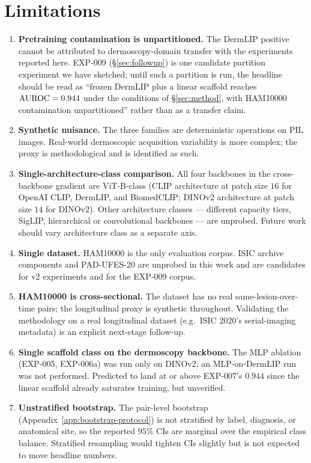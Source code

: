 \section{Limitations}
\label{sec:limitations}

\begin{enumerate}[leftmargin=2em]
\item \textbf{Pretraining contamination is unpartitioned.} The DermLIP
      positive cannot be attributed to dermoscopy-domain transfer with
      the experiments reported here. EXP-009 (\S\ref{sec:followup}) is
      one candidate partition experiment we have sketched; until such
      a partition is run, the headline should be read as ``frozen
      DermLIP plus a linear scaffold reaches $\mathrm{AUROC} = 0.944$ under
      the conditions of \S\ref{sec:method}, with HAM10000 contamination
      unpartitioned'' rather than as a transfer claim.
\item \textbf{Synthetic nuisance.} The three families are deterministic
      operations on PIL images. Real-world dermoscopic acquisition
      variability is more complex; the proxy is methodological and is
      identified as such.
\item \textbf{Single-architecture-class comparison.} All four backbones
      in the cross-backbone gradient are ViT-B-class (CLIP architecture
      at patch size $16$ for OpenAI CLIP, DermLIP, and BiomedCLIP;
      DINOv2 architecture at patch size $14$ for DINOv2). Other
      architecture classes --- different capacity tiers, SigLIP,
      hierarchical or convolutional backbones --- are unprobed. Future
      work should vary architecture class as a separate axis.
\item \textbf{Single dataset.} HAM10000 is the only evaluation corpus.
      ISIC archive components and PAD-UFES-20 are unprobed in this work
      and are candidates for v2 experiments and for the EXP-009 corpus.
\item \textbf{HAM10000 is cross-sectional.} The dataset has no real
      same-lesion-over-time pairs; the longitudinal proxy is synthetic
      throughout. Validating the methodology on a real longitudinal
      dataset (e.g.\ ISIC 2020's serial-imaging metadata) is an explicit
      next-stage follow-up.
\item \textbf{Single scaffold class on the dermoscopy backbone.} The MLP
      ablation (EXP-005, EXP-006a) was run only on DINOv2; an MLP-on-DermLIP
      run was not performed. Predicted to land at or above EXP-007's $0.944$
      since the linear scaffold already saturates training, but unverified.
\item \textbf{Unstratified bootstrap.} The pair-level bootstrap
      (Appendix~\ref{app:bootstrap-protocol}) is not stratified by
      label, diagnosis, or anatomical site, so the reported $95\%$ CIs
      are marginal over the empirical class balance. Stratified
      resampling would tighten CIs slightly but is not expected to move
      headline numbers.
\end{enumerate}
